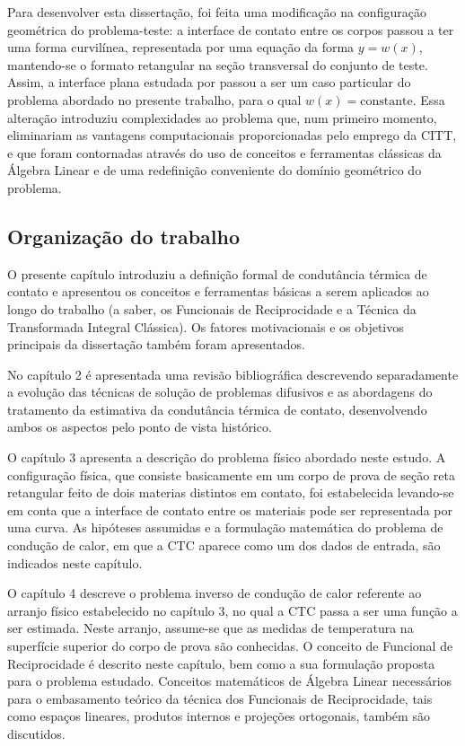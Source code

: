 Para desenvolver esta dissertação, foi feita uma modificação na configuração geométrica do problema-teste: a interface de contato entre os corpos passou a
ter uma forma curvilínea, representada por uma equação da forma $y = w(x)$, mantendo-se o formato retangular na seção transversal do conjunto
de teste. Assim, a interface plana estudada por \cite{tese_padilha} passou a ser um caso particular do problema abordado no presente trabalho, para
o qual $w(x) = \text{constante}$. Essa alteração introduziu complexidades ao problema que, num primeiro momento, eliminariam as vantagens computacionais
proporcionadas pelo emprego da CITT, e que foram contornadas através do uso de conceitos e ferramentas clássicas da Álgebra Linear e de uma redefinição conveniente
do domínio geométrico do problema.

\subsection{Organização do trabalho}

O presente capítulo introduziu a definição formal de condutância térmica de contato e apresentou os conceitos e ferramentas básicas a serem aplicados ao longo do trabalho (a saber, os Funcionais de Reciprocidade e a Técnica da Transformada Integral Clássica). Os fatores motivacionais e os objetivos principais da dissertação também foram apresentados.

No capítulo 2 é apresentada uma revisão bibliográfica descrevendo separadamente a evolução das técnicas de solução de problemas difusivos e as abordagens do tratamento da estimativa da condutância térmica de contato, desenvolvendo ambos os aspectos pelo ponto de vista histórico.

O capítulo 3 apresenta a descrição do problema físico abordado neste estudo. A configuração física, que consiste basicamente em um corpo de prova de seção reta retangular feito de dois materias distintos em contato, foi estabelecida levando-se em conta que a interface de contato entre os materiais pode ser representada por uma curva. As hipóteses assumidas e a formulação matemática do problema de condução de calor, em que a CTC aparece como um dos dados de entrada, são indicados neste capítulo.

O capítulo 4 descreve o problema inverso de condução de calor referente ao arranjo físico estabelecido no capítulo 3, no qual a CTC passa a ser uma função a ser estimada. Neste arranjo, assume-se que as medidas de temperatura na superfície superior do corpo de prova são conhecidas. O conceito de Funcional de Reciprocidade é descrito neste capítulo, bem como a sua formulação proposta para o problema estudado. Conceitos matemáticos de Álgebra Linear necessários para o embasamento teórico da técnica dos Funcionais de Reciprocidade, tais como espaços lineares, produtos internos e projeções ortogonais, também são discutidos.

